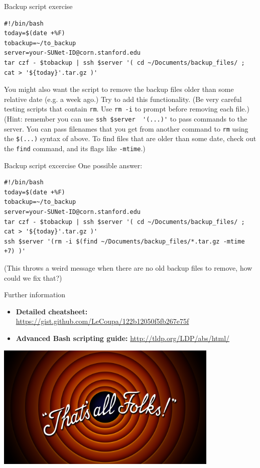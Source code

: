 \documentclass{beamer}
\begin{document}
\begin{frame}[fragile]{Backup script exercise}
\begin{lstlisting}
#!/bin/bash
today=$(date +%F)
tobackup=~/to_backup
server=your-SUNet-ID@corn.stanford.edu
tar czf - $tobackup | ssh $server '( cd ~/Documents/backup_files/ ; cat > '${today}'.tar.gz )'
\end{lstlisting}
You might also want the script to remove the backup files older than some relative date (e.g. a week ago.) Try to add this functionality. \alert{(Be very careful testing scripts that contain \lstinline|rm|. Use \lstinline|rm -i| to prompt before removing each file.)} (Hint: remember you can use \lstinline|ssh $server  '(...)'| to pass commands to the server. You can pass filenames that you get from another command to \lstinline|rm| using the \lstinline|$(...)| syntax of above. To find files that are older than some date, check out the \lstinline|find| command, and its flags like \lstinline|-mtime|.)
\end{frame}

\begin{frame}[fragile]{Backup script excercise}
One possible answer:
\begin{lstlisting}[title=backup.sh]
#!/bin/bash
today=$(date +%F)
tobackup=~/to_backup
server=your-SUNet-ID@corn.stanford.edu
tar czf - $tobackup | ssh $server '( cd ~/Documents/backup_files/ ; cat > '${today}'.tar.gz )'
ssh $server '(rm -i $(find ~/Documents/backup_files/*.tar.gz -mtime +7) )'
\end{lstlisting}
(This throws a weird message when there are no old backup files to remove, how could we fix that?)
\end{frame}

\begin{frame}{Further information}
\begin{itemize}
\item \textbf{Detailed cheatsheet:} {\color{blue} \url{https://gist.github.com/LeCoupa/122b12050f5fb267e75f}}
\item \textbf{Advanced Bash scripting guide:}  {\color{blue} \url{http://tldp.org/LDP/abs/html/}}
\end{itemize}
\begin{center}
\includegraphics[width = 0.8\textwidth]{images/thatsallfolks.png}
\end{center}

\end{frame}
\end{document}

